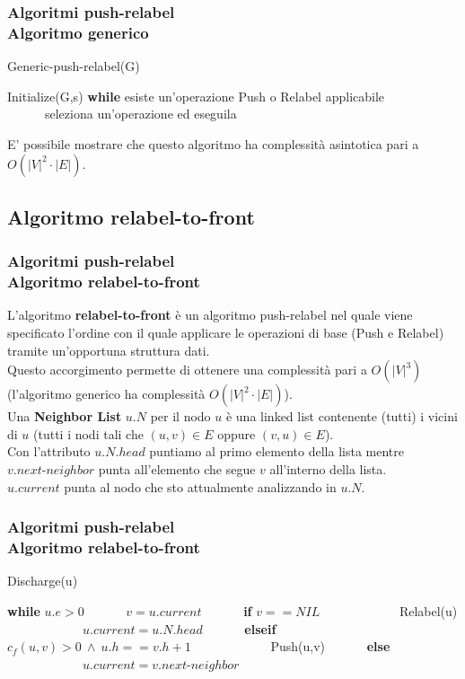 \documentclass{beamer}
\begin{document}
\begin{frame}
\frametitle{Algoritmi push-relabel\\Algoritmo generico}
\begin{algorithm}[H]
    \caption{Generic-push-relabel(G)}%
    \begin{algorithmic}[1]
        \State Initialize(G,s)
        \State \textbf{while} esiste un'operazione Push o Relabel applicabile
        \State \ \ \ \ \ \ seleziona un'operazione ed eseguila
    \end{algorithmic}
    \label{alg_1}
\end{algorithm}
E' possibile mostrare che questo algoritmo ha complessità asintotica pari a $O(|V|^2\cdot|E|)$.
\end{frame}

\subsection{Algoritmo relabel-to-front}

\begin{frame}
\frametitle{Algoritmi push-relabel\\Algoritmo relabel-to-front}
L'algoritmo \textbf{relabel-to-front} è un algoritmo push-relabel nel quale viene specificato l'ordine con il quale applicare le operazioni di base (Push e Relabel) tramite un'opportuna struttura dati.\\
Questo accorgimento permette di ottenere una complessità pari a $O(|V|^3)$ (l'algoritmo generico ha complessità $O(|V|^2\cdot|E|)$).\\
Una \textbf{Neighbor List} $u.N$ per il nodo $u$ è una linked list contenente (tutti) i vicini di $u$ (tutti i nodi tali che $(u,v)\in E$ oppure $(v,u)\in E$).\\
Con l'attributo $u.N.head$ puntiamo al primo elemento della lista mentre $v.next\mbox{-}neighbor$ punta all'elemento che segue $v$ all'interno della lista.\\
$u.current$ punta al nodo che sto attualmente analizzando in $u.N$.
\end{frame}

\begin{frame}
\frametitle{Algoritmi push-relabel\\Algoritmo relabel-to-front}
\begin{algorithm}[H]
    \caption{Discharge(u)}%
    \begin{algorithmic}[1]
        \State \textbf{while} $u.e>0$
        \State \ \ \ \ \ \ $v=u.current$
        \State \ \ \ \ \ \ \textbf{if} $v==NIL$
        \State \ \ \ \ \ \ \ \ \ \ \ \ Relabel(u)
        \State \ \ \ \ \ \ \ \ \ \ \ \ $u.current=u.N.head$
        \State \ \ \ \ \ \ \textbf{elseif} $c_f(u,v)>0\ \wedge\ u.h==v.h+1$
        \State \ \ \ \ \ \ \ \ \ \ \ \ Push(u,v)
        \State \ \ \ \ \ \ \textbf{else}
        \State \ \ \ \ \ \ \ \ \ \ \ \ $u.current=v.next\mbox{-}neighbor$
    \end{algorithmic}
    \label{alg_1}
\end{algorithm}
\end{frame}
\end{document}
